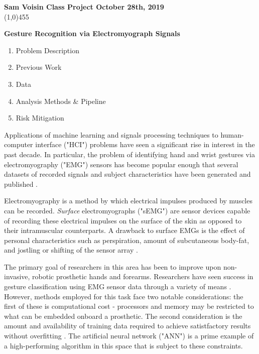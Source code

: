\documentclass[11pt]{article}
\begin{document}
\noindent \textbf{Sam Voisin \hfill  \textbf{Class Project}  \hfill  October 28th, 2019} \\
\line(1,0){455}

\begin{center}
\Large{{\bf Gesture Recognition via Electromyograph Signals}}\\
\end{center}

\begin{enumerate}
\item Problem Description

\item Previous Work

\item Data

\item Analysis Methods \& Pipeline

\item Risk Mitigation

\end{enumerate}

Applications of machine learning and signals processing techniques to human-computer interface ("HCI") problems have seen a significant rise in interest in the past decade. In particular, the problem of identifying hand and wrist gestures via electromyography ("EMG") sensors has become popular enough that several datasets of recorded signals and subject characteristics have been generated and published \cite{ninapro} \cite{lobov}.

Electromyography is a method by which electrical impulses produced by muscles can be recorded. \emph{Surface} electromyographs ("sEMG") are sensor devices capable of recording these electrical impulses on the surface of the skin as opposed to their intramuscular counterparts. A drawback to surface EMGs is the effect of personal characteristics such as perspiration, amount of subcutaneous body-fat, and jostling or shifting of the sensor array \cite{lobov}.

The primary goal of researchers in this area has been to improve upon non-invasive, robotic prosthetic hands and forearms. Researchers have seen success in gesture classification using EMG sensor data through a variety of means \cite{state}. However, methods employed for this task face two notable considerations: the first of these is computational cost - processors and memory may be restricted to what can be embedded onboard a prosthetic. The second consideration is the amount and availability of training data required to achieve satistfactory results without overfitting \cite{bigdata}. The artificial neural network ("ANN") is a prime example of a high-performing algorithm in this space that is subject to these constraints.
\end{document}
